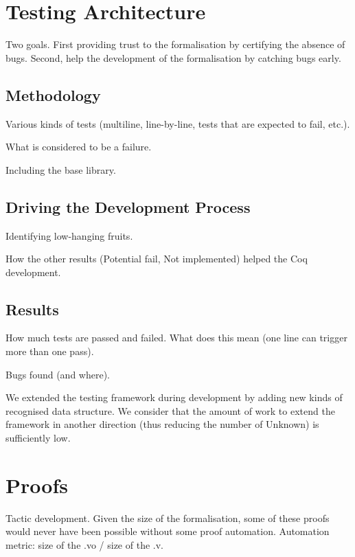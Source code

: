 \documentclass[
    sigplan,
    10pt,
    review, %
    natbib=false %
 ]{acmart}
\begin{document}
\section{Testing Architecture}
\label{sec:testing:architecture}

Two goals.
First providing trust to the formalisation by certifying the absence of bugs.
Second, help the development of the formalisation by catching bugs early.

\subsection{Methodology}
\label{sec:test:methodology}

Various kinds of tests (multiline, line-by-line, tests that are expected to fail, etc.).

What is considered to be a failure.

Including the base library.

\subsection{Driving the Development Process}
\label{sec:driving:development}

Identifying low-hanging fruits.

How the other results (Potential fail, Not implemented) helped the Coq development.

\subsection{Results}
\label{sec:test:results}

How much tests are passed and failed.
What does this mean (one line can trigger more than one pass).

Bugs found (and where).

We extended the testing framework during development by adding new kinds of recognised
data structure.
We consider that the amount of work to extend the framework in another direction
(thus reducing the number of Unknown) is sufficiently low.

\section{Proofs}
\label{sec:proofs}

Tactic development.
Given the size of the formalisation, some of these proofs would never have been possible
without some proof automation.
Automation metric: size of the .vo / size of the .v.
\end{document}
